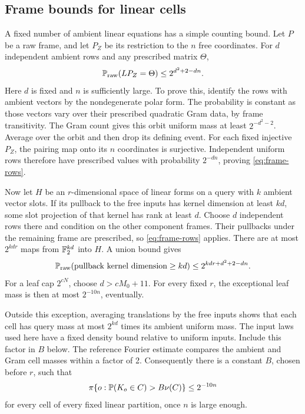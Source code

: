 \subsection{Frame bounds for linear cells}

A fixed number of ambient linear equations has a simple counting bound.
Let \(P\) be a raw frame, and let \(P_Z\) be its restriction to the
\(n\) free coordinates. For \(d\) independent ambient rows and any
prescribed matrix \(\Theta\),
\begin{equation}\label{eq:frame-rows}
 \mathbb P_{\rm raw}(LP_Z=\Theta)\le 2^{d^2+2-dn}.
\end{equation}
Here \(d\) is fixed and \(n\) is sufficiently large. To prove this,
identify the rows with ambient vectors by the nondegenerate polar form.
The probability is constant as those vectors vary over their prescribed
quadratic Gram data, by frame transitivity. The Gram count gives this
orbit uniform mass at least \(2^{-d^2-2}\). Average over the orbit and
then drop its defining event. For each fixed injective \(P_Z\), the
pairing map onto its \(n\) coordinates is surjective. Independent
uniform rows therefore have prescribed values with probability
\(2^{-dn}\), proving \eqref{eq:frame-rows}.

Now let \(H\) be an \(r\)-dimensional space of linear forms on a query
with \(k\) ambient vector slots. If its pullback to the free inputs has
kernel dimension at least \(kd\), some slot projection of that kernel
has rank at least \(d\). Choose \(d\) independent rows there and condition
on the other component frames. Their pullbacks under the remaining frame
are prescribed, so \eqref{eq:frame-rows} applies. There are at most
\(2^{kdr}\) maps from \(\mathbb F_2^{kd}\) into \(H\). A union bound gives
\begin{equation}\label{eq:cell-rank-deficit}
 \mathbb P_{\rm raw}(\text{pullback kernel dimension}\ge kd)
 \le 2^{kdr+d^2+2-dn}.
\end{equation}
For a leaf cap \(2^{cN}\), choose \(d>cM_0+11\). For every fixed
\(r\), the exceptional leaf mass is then at most \(2^{-10n}\), eventually.

Outside this exception, averaging translations by the free inputs shows
that each cell has query mass at most \(2^{kd}\) times its ambient
uniform mass. The input laws used here have a fixed density bound
relative to uniform inputs. Include this factor in \(B\) below. The
reference Fourier estimate compares the ambient and Gram cell masses
within a factor of 2. Consequently there is a constant \(B\), chosen
before \(r\), such that
\begin{equation}\label{eq:linear-cell-cap}
 \pi\{o:\mathbb P(K_o\in C)>B\nu(C)\}\le2^{-10n}
\end{equation}
for every cell of every fixed linear partition, once \(n\) is large enough.
